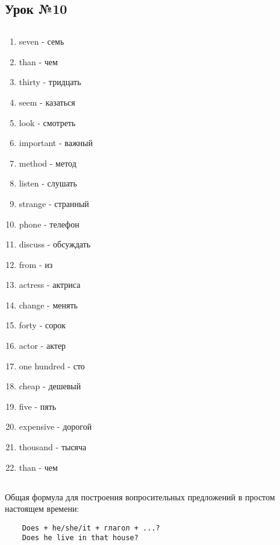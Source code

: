 \subsection{Урок №10}

\subsection*{}
\begin{multicols}{2}
    \begin{enumerate}\setlength{\itemsep}{0pt}
        \item seven - семь
        \item than - чем
        \item thirty - тридцать
        \item seem - казаться
        \item look - смотреть
        \item important - важный
        \item method - метод
        \item listen - слушать
        \item strange - странный
        \item phone - телефон
        \item discuss - обсуждать
        \item from - из
        \item actress - актриса
        \item change - менять
        \item forty - сорок
        \item actor - актер
        \item one hundred - сто
        \item cheap - дешевый
        \item five - пять
        \item expensive - дорогой
        \item thousand - тысяча
        \item than - чем
    \end{enumerate}
\end{multicols}

\subsection*{}
Общая формула для построения вопросительных предложений в простом настоящем времени:
\begin{verbatim}
    Does + he/she/it + глагол + ...?
    Does he live in that house?
\end{verbatim}